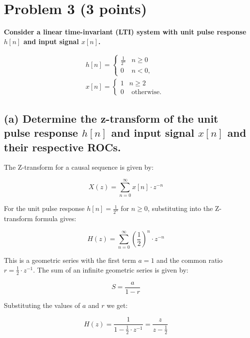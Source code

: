 \section{Problem 3 (3 points)}
\textbf{Consider a linear time-invariant (LTI) system with unit pulse response $h[n]$ and input signal $x[n]$.}

\begin{equation*}
    \begin{array}{l}h[n]=\left\{\begin{array}{ll}\frac{1}{2^{n}} & n \geq 0 \\ 0 & n<0,\end{array}\right. \\ x[n]=\left\{\begin{array}{ll}1 & n \geq 2 \\ 0 & \text { otherwise. }\end{array}\right.\end{array} 
\end{equation*}

\subsection*{(a) Determine the z-transform of the unit pulse response $h[n]$ and input signal $x[n]$ and their respective ROCs.}

The Z-transform for a causal sequence is given by:

\begin{equation*}
    X(z) = \sum_{n=0}^{\infty} x[n] \cdot z^{-n}
\end{equation*}

For the unit pulse response \( h[n] = \frac{1}{2^n} \) for \( n \geq 0 \), substituting into the Z-transform formula gives:

\begin{equation*}
    H(z) = \sum_{n=0}^{\infty} \left( \frac{1}{2} \right)^n \cdot z^{-n}
\end{equation*}

This is a geometric series with the first term \( a = 1 \) and the common ratio \( r = \frac{1}{2} \cdot z^{-1} \). The sum of an infinite geometric series is given by:

\begin{equation*}
    S = \frac{a}{1 - r}
\end{equation*}

Substituting the values of \( a \) and \( r \) we get:

\begin{equation*}
    H(z) = \frac{1}{1 - \frac{1}{2} \cdot z^{-1}} = \frac{z}{z - \frac{1}{2}}
\end{equation*}

